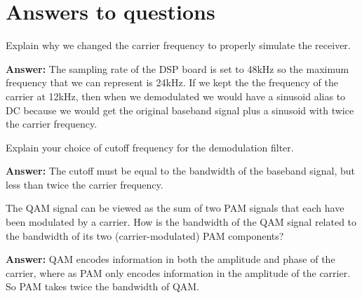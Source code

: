 \documentclass{article}
\begin{document}

\section{Answers to questions}

\begin{enumerate}
  \begin{item}
    Explain why we changed the carrier frequency to properly simulate the receiver. 

  \textbf{Answer:}
    The sampling rate of the DSP board is set to 48kHz so the maximum frequency that we can represent is 24kHz.
    If we kept the the frequency of the carrier at 12kHz, then when we demodulated we would have a sinusoid alias to DC
    because we would get the original baseband signal plus a sinusoid with twice the carrier frequency.
  \end{item}

  \begin{item}
    Explain your choice of cutoff frequency for the demodulation filter.

  \textbf{Answer:}
    The cutoff must be equal to the bandwidth of the baseband signal, but less than twice the carrier frequency.
  \end{item}

  \begin{item}
    The QAM signal can be viewed as the sum of two PAM signals that each have been modulated by a carrier. How is the bandwidth of the QAM signal related to the bandwidth of its two (carrier-modulated) PAM components?

  \textbf{Answer:}
    QAM encodes information in both the amplitude and phase of the carrier, where as PAM only encodes information in the amplitude of the carrier.
    So PAM takes twice the bandwidth of QAM.

  \end{item}
\end{enumerate}
\end{document}
